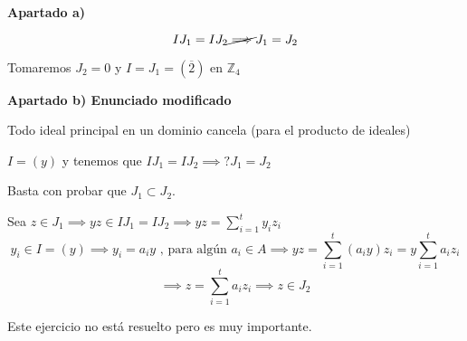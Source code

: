 \documentclass[openany]{book}
\begin{document}
\begin{exercise}
    $  $

    \begin{flushright}
        \textbf{Apartado a)}
    \end{flushright}
    

    $$ IJ_1 = IJ_2 \cancel{\implies} J_1 = J_2 $$

    Tomaremos $ J_2 = 0 $ y $ I = J_1 = (\overline{2})  $ en $ \mathbb{Z}_{4} $

    \begin{flushright}
        \textbf{Apartado b) Enunciado modificado}
    \end{flushright}
    
    Todo ideal principal en un dominio cancela (para el producto de ideales)

    $ I = (y) $ y tenemos que $ IJ_1 = IJ_2 \implies? J_1 = J_2 $

    Basta con probar que $ J_1 \subset  J_2 $.

    Sea $ z \in J_1 \implies yz \in IJ_1 = IJ_2 \implies yz = \sum\limits_{i=1}^{t}y_iz_i $
    $$ y_i \in I = (y) \implies y_i = a_iy \text{ , para algún }a_i \in A \implies yz = \sum\limits_{i=1}^{t}(a_iy)z_i = y \sum\limits_{i=1}^{t}a_iz_i  $$ 
    $$  \implies z = \sum\limits_{i=1}^{t}a_iz_i \implies z \in J_2$$


\end{exercise}

\begin{exercise}
    Este ejercicio no está resuelto pero es muy importante. 
\end{exercise}
\end{document}
